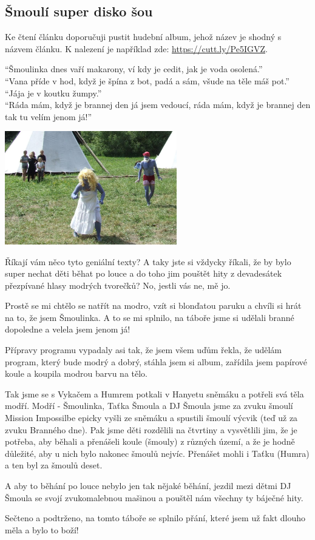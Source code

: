 \subsection*{Šmoulí super disko šou} %
\label{sub:šmoulí_super_disko_šou}


Ke čtení článku doporučuji pustit hudební album, jehož název je shodný s názvem článku.
K nalezení je například zde: \url{https://cutt.ly/Pe5IGVZ}.

“Šmoulinka dnes vaří makarony, ví kdy je cedit, jak je voda osolená.”\\
“Vana příde v hod, když je špína z bot, padá a sám, všude na těle máš pot.”\\
“Jája je v koutku žumpy.”\\
“Ráda mám, když je brannej den já jsem vedoucí, ráda mám, když je brannej den tak tu velím jenom já!”

\begin{center}

\includegraphics[width=7.5cm]{img/udo_clanky/smoulove.jpg}

\end{center}


Říkají vám něco tyto geniální texty? A taky jste si vždycky říkali, že by bylo super nechat děti běhat po louce a do toho jim pouštět hity z devadesátek přezpívané hlasy modrých tvorečků? No, jestli vás ne, mě jo.

Prostě se mi chtělo se natřít na modro, vzít si blonďatou paruku a chvíli si hrát na to, že jsem Šmoulinka. A to se mi splnilo, na táboře jsme si udělali branné dopoledne a velela jsem jenom já!

Přípravy programu vypadaly asi tak, že jsem všem uďům řekla, že udělám program, který bude modrý a dobrý, stáhla jsem si album, zařídila jsem papírové koule a koupila modrou barvu na tělo.

Tak jsme se s Vykačem a Humrem potkali v Hanyetu sněmáku a potřeli svá těla modří. Modří - Šmoulinka, Taťka Šmoula a DJ Šmoula jsme za zvuku šmoulí Mission Impossilbe epicky vyšli ze sněmáku a spustili šmoulí výcvik (teď už za zvuku Branného dne). Pak jsme děti rozdělili na čtvrtiny a vysvětlili jim, že je potřeba, aby běhali a přenášeli koule (šmouly) z různých území, a že je hodně důležité, aby u nich bylo nakonec šmoulů nejvíc. Přenášet mohli i Taťku (Humra) a ten byl za šmoulů deset.

A aby to běhání po louce nebylo jen tak nějaké běhání, jezdil mezi dětmi DJ Šmoula se svojí zvukomalebnou mašinou a pouštěl nám všechny ty báječné hity.

Sečteno a podtrženo, na tomto táboře se splnilo přání, které jsem už fakt dlouho měla a bylo to boží!



\clearpage